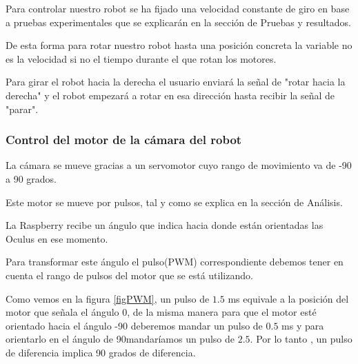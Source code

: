 \documentclass[twoside, 11pt]{epstfg}
\begin{document}
Para controlar nuestro robot se ha fijado una velocidad constante de giro en base a pruebas experimentales que se explicarán en la sección de Pruebas y resultados.

De esta forma para rotar nuestro robot hasta una posición concreta la variable no es la velocidad si no el tiempo durante el que rotan los motores.

Para girar el robot hacia la derecha el usuario enviará la señal de "rotar hacia la derecha" y el robot empezará a rotar en esa dirección hasta recibir la señal de "parar".

%
%
%



\subsubsection{\textbf{Control del motor de la cámara del robot}}

La cámara se mueve gracias a un servomotor cuyo rango de movimiento va de -90 a 90 grados.

Este motor se mueve por pulsos, tal y como se explica en la sección de Análisis.

La Raspberry recibe un ángulo que indica hacia donde están orientadas las Oculus en ese momento.

Para transformar este ángulo el pulso(PWM) correspondiente debemos tener en cuenta el rango de pulsos del motor que se está utilizando.

Como vemos en la figura \ref{figPWM}, un pulso de $1.5$ ms equivale a la posición del motor que señala el ángulo 0, de la misma manera para que el motor esté orientado hacia el ángulo -90 deberemos mandar un pulso de $0.5$ ms y para orientarlo en el ángulo de 90mandaríamos un pulso de $2.5$. Por lo tanto , un pulso de diferencia implica 90 grados de diferencia.
\end{document}
